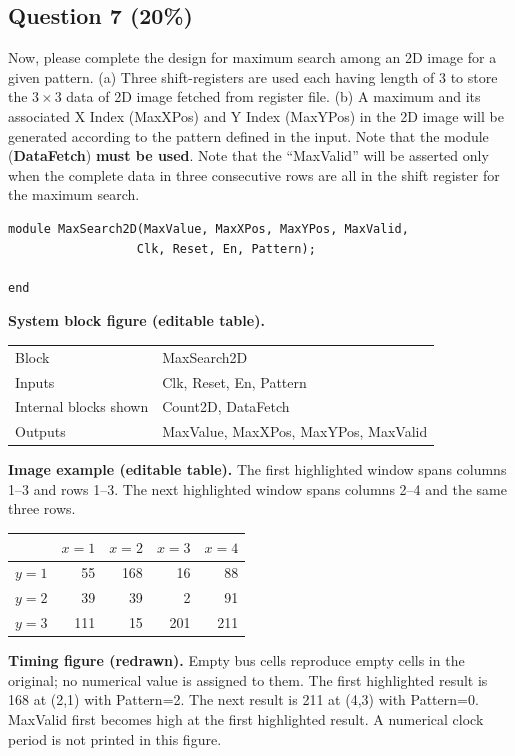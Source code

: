 \documentclass[11pt,a4paper]{article}
\newcommand{\question}[2]{\subsection*{Question #1 \hfill (#2\%)}}
\begin{document}
\question{7}{20}
Now, please complete the design for maximum search among an 2D image for
a given pattern. (a) Three shift-registers are used each having length of
3 to store the $3\times3$ data of 2D image fetched from register file.
(b) A maximum and its associated X Index (MaxXPos) and Y Index (MaxYPos)
in the 2D image will be generated according to the pattern defined in the
input. Note that the module (\textbf{DataFetch}) \textbf{must be used}.
Note that the ``MaxValid'' will be asserted only when the complete data
in three consecutive rows are all in the shift register for the maximum
search.
\begin{verbatim}
module MaxSearch2D(MaxValue, MaxXPos, MaxYPos, MaxValid,
                  Clk, Reset, En, Pattern);

end
\end{verbatim}
\textbf{System block figure (editable table).}
\begin{center}
\begin{tabular}{ll}\toprule
Block & MaxSearch2D\\
Inputs & Clk, Reset, En, Pattern\\
Internal blocks shown & Count2D, DataFetch\\
Outputs & MaxValue, MaxXPos, MaxYPos, MaxValid\\\bottomrule
\end{tabular}
\end{center}
\textbf{Image example (editable table).} The first highlighted window
spans columns 1--3 and rows 1--3. The next highlighted window spans
columns 2--4 and the same three rows.
\begin{center}
\begin{tabular}{c|rrrr}\toprule
 & $x=1$ & $x=2$ & $x=3$ & $x=4$\\\midrule
$y=1$ & 55 & 168 & 16 & 88\\
$y=2$ & 39 & 39 & 2 & 91\\
$y=3$ & 111 & 15 & 201 & 211\\\bottomrule
\end{tabular}
\end{center}
\textbf{Timing figure (redrawn).} Empty bus cells reproduce empty cells
in the original; no numerical value is assigned to them. The first
highlighted result is 168 at (2,1) with Pattern=2. The next result is
211 at (4,3) with Pattern=0. MaxValid first becomes high at the first
highlighted result. A numerical clock period is not printed in this
figure.
\end{document}
